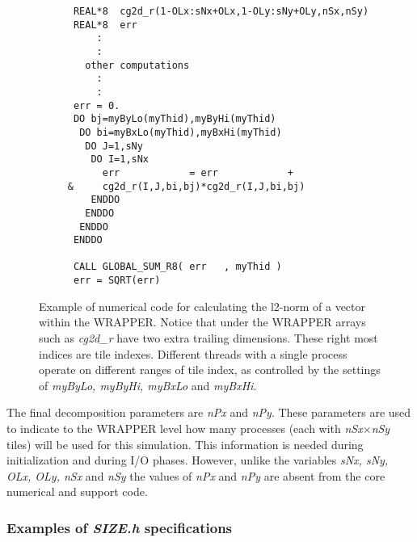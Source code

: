 \begin{figure}
\begin{verbatim}
      REAL*8  cg2d_r(1-OLx:sNx+OLx,1-OLy:sNy+OLy,nSx,nSy)
      REAL*8  err
          :
          :
        other computations
          :
          :
      err = 0.
      DO bj=myByLo(myThid),myByHi(myThid)
       DO bi=myBxLo(myThid),myBxHi(myThid)
        DO J=1,sNy
         DO I=1,sNx
           err            = err            +
     &     cg2d_r(I,J,bi,bj)*cg2d_r(I,J,bi,bj)
         ENDDO
        ENDDO
       ENDDO
      ENDDO

      CALL GLOBAL_SUM_R8( err   , myThid )
      err = SQRT(err)

\end{verbatim}
\caption{Example of numerical code for calculating
the l2-norm of a vector within the WRAPPER. Notice that
under the WRAPPER arrays such as {\em cg2d\_r} have two extra trailing
dimensions. These right most indices are tile indexes. Different
threads with a single process operate on different ranges of tile
index, as controlled by the settings of
{\em myByLo, myByHi, myBxLo} and {\em myBxHi}.
} \label{fig:bibj_extract}
\end{figure}

 The final decomposition parameters are {\em nPx} and {\em nPy}. These parameters
are used to indicate to the WRAPPER level how many processes (each with
{\em nSx}$\times${\em nSy} tiles) will be used for this simulation. 
This information is needed during initialization and during I/O phases.
However, unlike the variables {\em sNx, sNy, OLx, OLy, nSx} and {\em nSy}
the values of {\em nPx} and {\em nPy} are absent
from the core numerical and support code.

\subsubsection{Examples of {\em SIZE.h} specifications}

